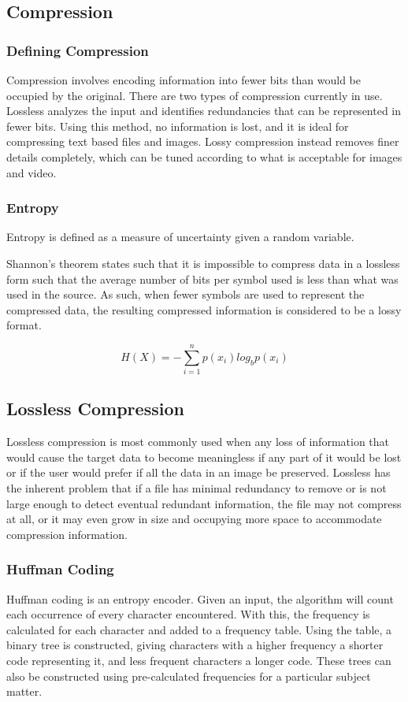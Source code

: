 \documentclass[12pt]{CPP}
\begin{document}
\subsection{Compression}

\subsubsection{Defining Compression}
Compression involves encoding information into fewer bits than would be occupied by the original. There are two types of compression currently in use. Lossless analyzes the input and identifies redundancies that can be represented in fewer bits. Using this method, no information is lost, and it is ideal for compressing text based files and images. Lossy compression instead removes finer details completely, which can be tuned according to what is acceptable for images and video.

\subsubsection{Entropy}
Entropy is defined as a measure of uncertainty given a random variable.

Shannon's theorem states such that it is impossible to compress data in a lossless form such that the average number of bits per symbol used is less than what was used in the source. As such, when fewer symbols are used to represent the compressed data, the resulting compressed information is considered to be a lossy format. \citep{Shannon}

\[
H(X) = -\sum_{i=1}^{n} p(x_i)log_b p(x_i)
\]

\subsection{Lossless Compression}
Lossless compression is most commonly used when any loss of information that would cause the target data to become meaningless if any part of it would be lost or if the user would prefer if all the data in an image be preserved. Lossless has the inherent problem that if a file has minimal redundancy to remove or is not large enough to detect eventual redundant information, the file may not compress at all, or it may even grow in size and occupying more space to accommodate compression information.

\subsubsection{Huffman Coding}
Huffman coding is an entropy encoder. Given an input, the algorithm will count each occurrence of every character encountered. With this, the frequency is calculated for each character and added to a frequency table. Using the table, a binary tree is constructed, giving characters with a higher frequency a shorter code representing it, and less frequent characters a longer code. These trees can also be constructed using pre-calculated frequencies for a particular subject matter.
\end{document}
